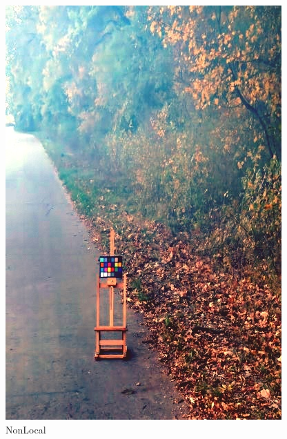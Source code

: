 \documentclass[12pt]{article}
\begin{document}
\begin{figure}[!h]
\begin{minipage}[t]{0.24\linewidth}
        \includegraphics[width=0.9\linewidth]{sample_pictures/after_OHAZY_NonLocal.jpg}
        \caption*{NonLocal}
    \end{minipage}
 \end{figure}
 \newpage
\end{document}
